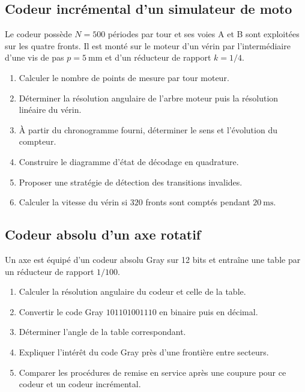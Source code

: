 
\subsection{Codeur incrémental d'un simulateur de moto}

Le codeur possède $N=500$ périodes par tour et ses voies A et B sont exploitées sur les quatre fronts. Il est monté sur le moteur d'un vérin par l'intermédiaire d'une vis de pas $p=5\ \mathrm{mm}$ et d'un réducteur de rapport $k=1/4$.

\begin{enumerate}
  \item Calculer le nombre de points de mesure par tour moteur.
  \item Déterminer la résolution angulaire de l'arbre moteur puis la résolution linéaire du vérin.
  \item À partir du chronogramme fourni, déterminer le sens et l'évolution du compteur.
  \item Construire le diagramme d'état de décodage en quadrature.
  \item Proposer une stratégie de détection des transitions invalides.
  \item Calculer la vitesse du vérin si $320$ fronts sont comptés pendant $20\ \mathrm{ms}$.
\end{enumerate}


\subsection{Codeur absolu d'un axe rotatif}

Un axe est équipé d'un codeur absolu Gray sur 12 bits et entraîne une table par un réducteur de rapport $1/100$.

\begin{enumerate}
  \item Calculer la résolution angulaire du codeur et celle de la table.
  \item Convertir le code Gray $101101001110$ en binaire puis en décimal.
  \item Déterminer l'angle de la table correspondant.
  \item Expliquer l'intérêt du code Gray près d'une frontière entre secteurs.
  \item Comparer les procédures de remise en service après une coupure pour ce codeur et un codeur incrémental.
\end{enumerate}

